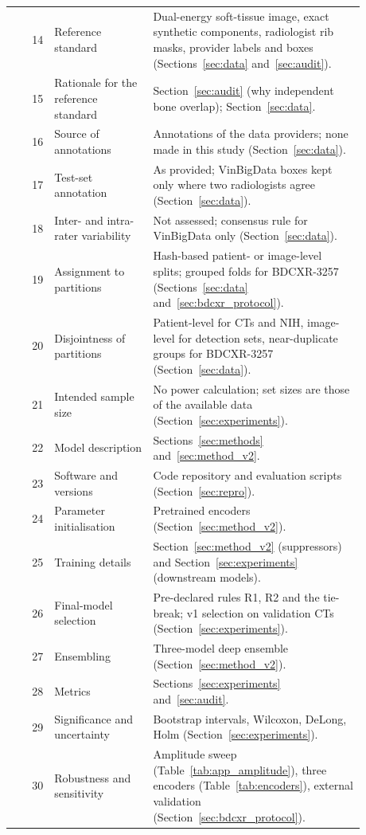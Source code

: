 {\begin{longtable}{@{}rp{0.28\linewidth}p{0.6\linewidth}@{}}
14 & Reference standard & Dual-energy soft-tissue image, exact synthetic components, radiologist rib masks, provider labels and boxes (Sections~\ref{sec:data} and~\ref{sec:audit}). \\
15 & Rationale for the reference standard & Section~\ref{sec:audit} (why independent bone overlap); Section~\ref{sec:data}. \\
16 & Source of annotations & Annotations of the data providers; none made in this study (Section~\ref{sec:data}). \\
17 & Test-set annotation & As provided; VinBigData boxes kept only where two radiologists agree (Section~\ref{sec:data}). \\
18 & Inter- and intra-rater variability & Not assessed; consensus rule for VinBigData only (Section~\ref{sec:data}). \\
19 & Assignment to partitions & Hash-based patient- or image-level splits; grouped folds for BDCXR-3257 (Sections~\ref{sec:data} and~\ref{sec:bdcxr_protocol}). \\
20 & Disjointness of partitions & Patient-level for CTs and NIH, image-level for detection sets, near-duplicate groups for BDCXR-3257 (Section~\ref{sec:data}). \\
21 & Intended sample size & No power calculation; set sizes are those of the available data (Section~\ref{sec:experiments}). \\
22 & Model description & Sections~\ref{sec:methods} and~\ref{sec:method_v2}. \\
23 & Software and versions & Code repository and evaluation scripts (Section~\ref{sec:repro}). \\
24 & Parameter initialisation & Pretrained encoders (Section~\ref{sec:method_v2}). \\
25 & Training details & Section~\ref{sec:method_v2} (suppressors) and Section~\ref{sec:experiments} (downstream models). \\
26 & Final-model selection & Pre-declared rules R1, R2 and the tie-break; v1 selection on validation CTs (Section~\ref{sec:experiments}). \\
27 & Ensembling & Three-model deep ensemble (Section~\ref{sec:method_v2}). \\
28 & Metrics & Sections~\ref{sec:experiments} and~\ref{sec:audit}. \\
29 & Significance and uncertainty & Bootstrap intervals, Wilcoxon, DeLong, Holm (Section~\ref{sec:experiments}). \\
30 & Robustness and sensitivity & Amplitude sweep (Table~\ref{tab:app_amplitude}), three encoders (Table~\ref{tab:encoders}), external validation (Section~\ref{sec:bdcxr_protocol}). \\

\end{longtable}}
